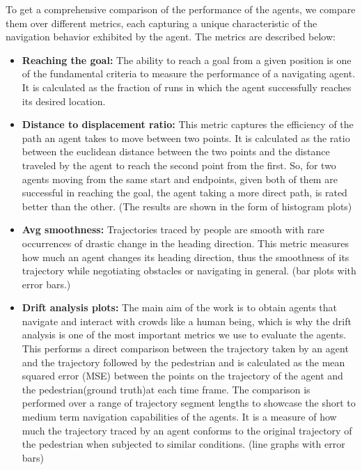 To get a comprehensive comparison of the performance of the agents, we compare them over different metrics, each capturing a unique characteristic of the navigation behavior exhibited by the agent. The metrics are described below:
\begin{itemize}
        \item \textbf{Reaching the goal:} The ability to reach a goal from a given position is one of the fundamental criteria to measure the performance of a navigating agent. It is calculated as the fraction of runs in which the agent successfully reaches its desired location.
        \item \textbf{Distance to displacement ratio:} This metric captures the efficiency of the path an agent takes to move between two points. It is calculated as the ratio between the euclidean distance between the two points and the distance traveled by the agent to reach the second point from the first. So, for two agents moving from the same start and endpoints, given both of them are successful in reaching the goal, the agent taking a more direct path, is rated better than the other. (The results are shown in the form of histogram plots)
        \item \textbf{Avg smoothness:} Trajectories traced by people are smooth with rare occurrences of drastic change in the heading direction. This metric measures how much an agent changes its heading direction, thus the smoothness of its trajectory while negotiating obstacles or navigating in general. (bar plots with error bars.)
        \item \textbf{Drift analysis plots: }The main aim of the work is to obtain agents that navigate and interact with crowds like a human being, which is why the drift analysis is one of the most important metrics we use to evaluate the agents. This performs a direct comparison between the trajectory taken by an agent and the trajectory followed by the pedestrian and is calculated as the mean squared error (MSE) between the points on the trajectory of the agent and the pedestrian(ground truth)at each time frame. The comparison is performed over a range of trajectory segment lengths to showcase the short to medium term navigation capabilities of the agents. It is a measure of how much the trajectory traced by an agent conforms to the original trajectory of the pedestrian when subjected to similar conditions. (line graphs with error bars)\\

\end{itemize}
